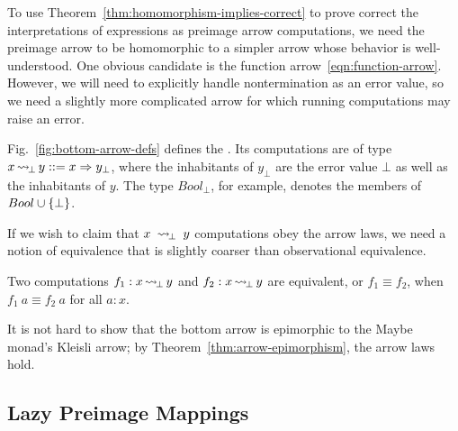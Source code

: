 \documentclass{llncs}
\newcommand{\figref}[1]{Fig.~\ref{#1}}
\newcommand{\arrow}{\rightsquigarrow}
\DeclareMathOperator{\botto}{\arrow_{\mspace{-3mu}\bot}}
\begin{document}
To use Theorem~\ref{thm:homomorphism-implies-correct} to prove correct the interpretations of expressions as preimage arrow computations, we need the preimage arrow to be homomorphic to a simpler arrow whose behavior is well-understood.
One obvious candidate is the function arrow~\eqref{eqn:function-arrow}.
However, we will need to explicitly handle nontermination as an error value, so we need a slightly more complicated arrow for which running computations may raise an error.

\figref{fig:bottom-arrow-defs} defines the .
Its computations are of type $x \botto y ::= x \tto y_\bot$, where the inhabitants of $y_\bot$ are the error value $\bot$ as well as the inhabitants of $y$.
The type $Bool_\bot$, for example, denotes the members of $Bool \cup \{{\bot}\}$.

If we wish to claim that $x~\botto~y$ computations obey the arrow laws, we need a notion of equivalence that is slightly coarser than observational equivalence.
\begin{definition}
Two computations $f_1 : x \botto y$ and $f_2 : x \botto y$ are equivalent, or $f_1 \equiv f_2$, when $f_1~a \equiv f_2~a$ for all $a : x$.
\end{definition}

It is not hard to show that the bottom arrow is epimorphic to the Maybe monad's Kleisli arrow; by Theorem~\ref{thm:arrow-epimorphism}, the arrow laws hold.

\subsection{Lazy Preimage Mappings}
\label{sec:lazy-preimage-mappings}
\end{document}
